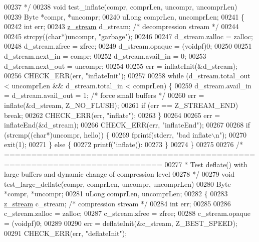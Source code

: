 \begin{DoxyCode}
{{{{{{{{{{{00237 \textcolor{comment}{ */}
00238 \textcolor{keywordtype}{void} test\_inflate(compr, comprLen, uncompr, uncomprLen)
00239     Byte *compr, *uncompr;
00240     uLong comprLen, uncomprLen;
00241 \{
00242     \textcolor{keywordtype}{int} err;
00243     \hyperlink{structz__stream__s}{z\_stream} d\_stream; \textcolor{comment}{/* decompression stream */}
00244 
00245     strcpy((\textcolor{keywordtype}{char}*)uncompr, \textcolor{stringliteral}{"garbage"});
00246 
00247     d\_stream.zalloc = zalloc;
00248     d\_stream.zfree = zfree;
00249     d\_stream.opaque = (voidpf)0;
00250 
00251     d\_stream.next\_in  = compr;
00252     d\_stream.avail\_in = 0;
00253     d\_stream.next\_out = uncompr;
00254 
00255     err = inflateInit(&d\_stream);
00256     CHECK\_ERR(err, \textcolor{stringliteral}{"inflateInit"});
00257 
00258     \textcolor{keywordflow}{while} (d\_stream.total\_out < uncomprLen && d\_stream.total\_in < comprLen) \{
00259         d\_stream.avail\_in = d\_stream.avail\_out = 1; \textcolor{comment}{/* force small buffers */}
00260         err = inflate(&d\_stream, Z\_NO\_FLUSH);
00261         \textcolor{keywordflow}{if} (err == Z\_STREAM\_END) \textcolor{keywordflow}{break};
00262         CHECK\_ERR(err, \textcolor{stringliteral}{"inflate"});
00263     \}
00264 
00265     err = inflateEnd(&d\_stream);
00266     CHECK\_ERR(err, \textcolor{stringliteral}{"inflateEnd"});
00267 
00268     \textcolor{keywordflow}{if} (strcmp((\textcolor{keywordtype}{char}*)uncompr, hello)) \{
00269         fprintf(stderr, \textcolor{stringliteral}{"bad inflate\(\backslash\)n"});
00270         exit(1);
00271     \} \textcolor{keywordflow}{else} \{
00272         printf(\textcolor{stringliteral}{"inflate(): %
00273     \}
00274 \}
00275 
00276 \textcolor{comment}{/* ===========================================================================}
00277 \textcolor{comment}{ * Test deflate() with large buffers and dynamic change of compression level}
00278 \textcolor{comment}{ */}
00279 \textcolor{keywordtype}{void} test\_large\_deflate(compr, comprLen, uncompr, uncomprLen)
00280     Byte *compr, *uncompr;
00281     uLong comprLen, uncomprLen;
00282 \{
00283     \hyperlink{structz__stream__s}{z\_stream} c\_stream; \textcolor{comment}{/* compression stream */}
00284     \textcolor{keywordtype}{int} err;
00285 
00286     c\_stream.zalloc = zalloc;
00287     c\_stream.zfree = zfree;
00288     c\_stream.opaque = (voidpf)0;
00289 
00290     err = deflateInit(&c\_stream, Z\_BEST\_SPEED);
00291     CHECK\_ERR(err, \textcolor{stringliteral}{"deflateInit"});
}}}}}}}}}}}}
\end{DoxyCode}
